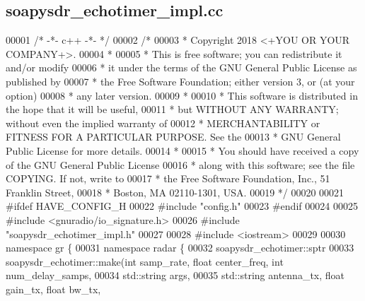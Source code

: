 \subsection{soapysdr\+\_\+echotimer\+\_\+impl.\+cc}
\label{soapysdr__echotimer__impl_8cc_source}

\begin{DoxyCode}
00001 \textcolor{comment}{/* -*- c++ -*- */}
00002 \textcolor{comment}{/*}
00003 \textcolor{comment}{* Copyright 2018 <+YOU OR YOUR COMPANY+>.}
00004 \textcolor{comment}{*}
00005 \textcolor{comment}{* This is free software; you can redistribute it and/or modify}
00006 \textcolor{comment}{* it under the terms of the GNU General Public License as published by}
00007 \textcolor{comment}{* the Free Software Foundation; either version 3, or (at your option)}
00008 \textcolor{comment}{* any later version.}
00009 \textcolor{comment}{*}
00010 \textcolor{comment}{* This software is distributed in the hope that it will be useful,}
00011 \textcolor{comment}{* but WITHOUT ANY WARRANTY; without even the implied warranty of}
00012 \textcolor{comment}{* MERCHANTABILITY or FITNESS FOR A PARTICULAR PURPOSE.  See the}
00013 \textcolor{comment}{* GNU General Public License for more details.}
00014 \textcolor{comment}{*}
00015 \textcolor{comment}{* You should have received a copy of the GNU General Public License}
00016 \textcolor{comment}{* along with this software; see the file COPYING.  If not, write to}
00017 \textcolor{comment}{* the Free Software Foundation, Inc., 51 Franklin Street,}
00018 \textcolor{comment}{* Boston, MA 02110-1301, USA.}
00019 \textcolor{comment}{*/}
00020 
00021 \textcolor{preprocessor}{#ifdef HAVE\_CONFIG\_H}
00022 \textcolor{preprocessor}{#include "config.h"}
00023 \textcolor{preprocessor}{#endif}
00024 
00025 \textcolor{preprocessor}{#include <gnuradio/io\_signature.h>}
00026 \textcolor{preprocessor}{#include "soapysdr_echotimer_impl.h"}
00027 
00028 \textcolor{preprocessor}{#include <iostream>}
00029 
00030 \textcolor{keyword}{namespace }gr \{
00031   \textcolor{keyword}{namespace }radar \{
00032     soapysdr_echotimer::sptr
00033     soapysdr_echotimer::make(\textcolor{keywordtype}{int} samp_rate, \textcolor{keywordtype}{float} center_freq, \textcolor{keywordtype}{int} num\_delay\_samps,
00034                               std::string args,
00035                               std::string antenna\_tx, \textcolor{keywordtype}{float} gain\_tx, \textcolor{keywordtype}{float} bw\_tx,

\end{DoxyCode}
